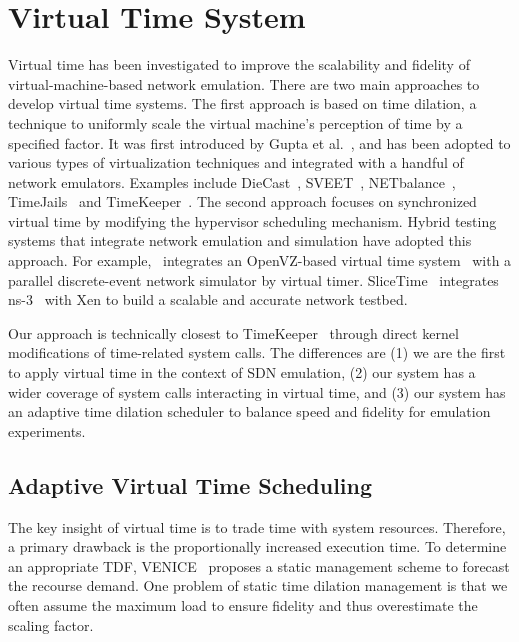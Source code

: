 \section{Virtual Time System}
\label{VT:Sec:RelatedWorks}

Virtual time has been investigated to improve the scalability and fidelity of virtual-machine-based network emulation. 
There are two main approaches to develop virtual time systems.
The first approach is based on time dilation, a technique to uniformly scale the virtual machine's perception of time by a specified factor. 
It was first introduced by Gupta et al.~\cite{ToInfinityBeyond},
and has been adopted to various types of virtualization techniques and integrated with a handful of network emulators. 
Examples include DieCast~\cite{DieCast}, SVEET~\cite{SVEET}, NETbalance~\cite{NETbalance}, TimeJails~\cite{ComparisonVR-VM, TimeJails} and TimeKeeper~\cite{TimeKeeper}. 
The second approach focuses on synchronized virtual time by modifying the hypervisor scheduling mechanism. 
Hybrid testing systems that integrate network emulation and simulation have adopted this approach. 
For example,~\cite{jin2012virtual} integrates an OpenVZ-based virtual time system~\cite{VirtTimeOpenVZ} with
a parallel discrete-event network simulator by virtual timer.
SliceTime~\cite{SliceTime} integrates ns-3~\cite{NS-3} with Xen to build a scalable and accurate network testbed.

Our approach is technically closest to TimeKeeper~\cite{TimeKeeper} through direct kernel modifications of time-related system calls. 
The differences are (1) we are the first to apply virtual time in the context of SDN emulation,
(2) our system has a wider coverage of system calls interacting in virtual time,
and (3) our system has an adaptive time dilation scheduler to balance speed and fidelity for emulation experiments.

\subsection{Adaptive Virtual Time Scheduling}
The key insight of virtual time is to trade time with system resources. 
Therefore, a primary drawback is the proportionally increased execution time.
To determine an appropriate TDF, VENICE~\cite{VirtualTimeMachine} proposes a static management scheme to forecast the recourse demand. 
One problem of static time dilation management is that we often assume the maximum load to ensure fidelity and thus overestimate the scaling factor. 

